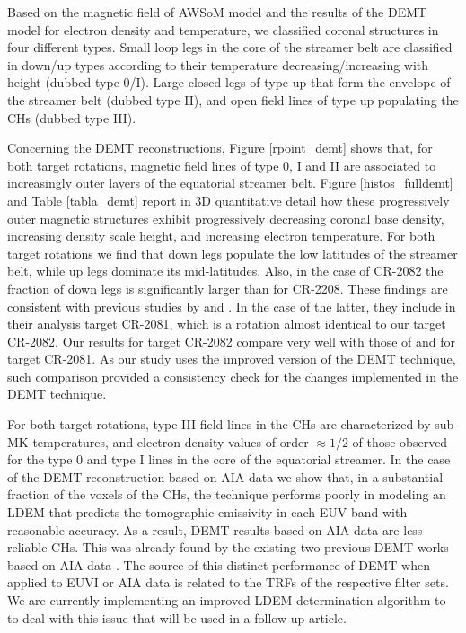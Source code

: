 \documentclass[namedreferences]{solarphysics}
\begin{document}
\begin{article}
{Based on the magnetic field of AWSoM model and the results of the DEMT model for electron density and temperature, we classified coronal structures in four different types. {Small loop legs} in the core of the streamer belt are classified in down/up types according to their temperature decreasing/increasing with height (dubbed type 0/I). {Large closed legs} of type up that form the envelope of the streamer belt (dubbed type II), and open field lines of type up populating the CHs (dubbed type III).}

Concerning the DEMT reconstructions, Figure \ref{rpoint_demt} shows that, for both target rotations, magnetic field lines of type 0, I and II are associated to increasingly outer {layers} of the equatorial streamer belt. Figure \ref{histos_fulldemt} and Table \ref{tabla_demt} report in 3D quantitative detail how these progressively outer magnetic structures exhibit progressively decreasing coronal base density, increasing density scale height, and increasing electron temperature. For both target rotations we find that down legs populate the low latitudes of the streamer belt, while up legs dominate its mid-latitudes. Also, in the case of CR-2082 the fraction of down legs is significantly larger than for CR-2208. These findings are consistent with previous studies by \citet{huang_2012} and \citet{nuevo_2013}. In the case of the latter, they include in their analysis target CR-2081, which is a rotation almost identical to our target CR-2082. Our results for target CR-2082 compare very well with those of \citet{nuevo_2015} and \citet{lloveras_2017} for target CR-2081. As our study uses the improved version of the DEMT technique, such comparison provided a consistency check for the changes implemented in the DEMT technique.

{{For both target rotations}, type III field lines in the CHs are characterized by sub-MK temperatures, and electron density values of order $\approx 1/2$ of those observed for the type 0 and type I lines in the core of the equatorial streamer. In the case of the {DEMT reconstruction based on AIA data we show that, in} a substantial fraction of the {voxels of the CHs,} the technique performs poorly in modeling {an LDEM that predicts} the tomographic emissivity in each EUV band with reasonable accuracy. As a result, DEMT results based on AIA data {are less reliable CHs}. This was already found by the existing two previous DEMT works based on AIA data \citep{nuevo_2015,maccormack_2017}. The source of this distinct performance of DEMT when applied to EUVI or AIA data is related to the TRFs of the respective filter sets. We are currently implementing an improved LDEM determination algorithm to to deal with this issue that will be used in a follow up article.}


\end{article}
\end{document}

